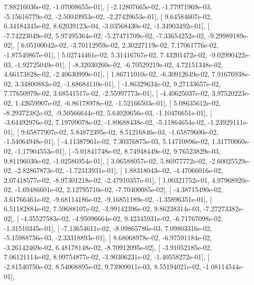\documentclass{article}
\begin{document}
          7.88216036e-02,  -1.07008655e-01],
       [ -2.12807665e-02,  -1.77971969e-03,  -5.15616779e-02,
         -2.50049953e-02,  -2.27429653e-01],
       [  9.64584607e-02,   6.34184345e-02,   8.62039123e-04,
         -3.03568430e-02,  -1.34903492e-01],
       [ -7.74223049e-02,   5.97495364e-02,  -5.27471709e-02,
         -7.33654252e-02,  -9.29989189e-02],
       [  6.05100042e-02,  -3.70112959e-02,   2.30227119e-02,
          7.17061776e-02,  -1.87540867e-01],
       [  5.02744461e-02,   5.31416767e-02,   7.43201472e-02,
         -9.02990422e-03,  -1.92725049e-01],
       [ -8.32030260e-02,  -6.70529219e-02,   4.72151348e-02,
          4.66173828e-02,  -2.40630999e-01],
       [  1.86711010e-02,  -6.30912649e-02,   7.91676938e-02,
          3.34800883e-02,  -1.68684110e-01],
       [ -1.86329634e-02,   9.27133657e-02,   7.77650979e-02,
          3.68541517e-02,  -2.55997773e-01],
       [ -4.40625037e-02,   3.97520223e-02,   1.42659907e-02,
         -6.86178978e-02,  -1.52166503e-01],
       [  5.08635612e-02,  -8.29372382e-02,  -9.50566644e-02,
          5.64020656e-03,  -1.10476651e-01],
       [ -3.64492976e-02,   7.19709078e-02,  -1.89688438e-02,
         -5.11864654e-02,  -1.23929111e-01],
       [  9.65877907e-02,   5.84872395e-02,   8.51216846e-03,
         -1.65879600e-02,  -1.54064948e-01],
       [ -4.11387961e-02,   7.30376875e-03,   5.14710896e-02,
          1.31770060e-02,  -1.17904553e-01],
       [ -5.01841748e-02,   8.74948449e-02,   9.76523829e-03,
          9.81196030e-02,  -1.02586954e-01],
       [  3.06588057e-02,   5.86977772e-02,  -2.60025529e-02,
         -2.82867873e-02,  -1.72313931e-01],
       [  1.88318043e-02,  -4.47066016e-02,   2.07418577e-02,
         -8.97301218e-02,  -2.47910357e-01],
       [  1.00321752e-01,   4.97968920e-02,  -1.69486601e-02,
          2.12795710e-02,  -7.70400085e-02],
       [ -4.38715490e-02,   3.61766461e-02,  -9.68114186e-02,
         -9.16851189e-02,  -1.35896351e-01],
       [  6.51182884e-02,   7.59688107e-02,  -3.99142396e-02,
          9.86238314e-03,  -7.27273382e-02],
       [ -4.35527583e-02,  -4.95096664e-02,   9.42345931e-02,
         -6.71767098e-02,  -1.31510345e-01],
       [ -7.13654611e-02,  -8.09865786e-03,   7.09803316e-02,
         -5.15988756e-03,  -2.33318893e-01],
       [  8.68068978e-02,  -6.97591184e-02,  -3.26142469e-02,
          6.48178148e-02,  -8.70912095e-02],
       [ -3.91052185e-02,   7.06121114e-02,   8.99754877e-02,
         -3.90306231e-02,  -1.40558272e-01],
       [ -2.81540750e-02,   8.54008895e-02,   9.73909011e-03,
          8.55194021e-02,  -1.08114544e-01],
\end{document}
